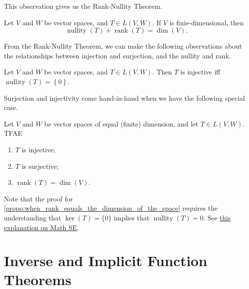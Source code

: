 \documentclass[notoc,notitlepage]{tufte-book}
\DeclareMathOperator{\nullity}{nullity}
\DeclareMathOperator{\rank}{rank}
\begin{document}
This observation gives us the Rank-Nullity Theorem.

\begin{thm}\label{thm:rank_nullity_theorem}
  Let $V$ and $W$ be vector spaces, and $T \in L(V, W)$. If $V$ is finie-dimensional, then
  \begin{equation*}
    \nullity(T) + \rank(T) = \dim (V).
  \end{equation*}
\end{thm}

From the Rank-Nullity Theorem,
we can make the following observations about the relationships
between injection and surjection, and the nullity and rank.

\begin{propo}\label{propo:nullity_of_only_0_and_injectivity}
  Let $V$ and $W$ be vector spaces, and $T \in L(V, W)$.
  Then $T$ is injective iff $\nullity(T) = \left\{ 0 \right\}$.
\end{propo}

Surjection and injectivity come hand-in-hand when
we have the following special case.

\begin{propo}\label{propo:when_rank_equals_the_dimension_of_the_space}
  Let $V$ and $W$ be vector spaces of equal (finite) dimension,
  and let $T \in L(V, W)$. TFAE
  \begin{enumerate}
    \item $T$ is injective;
    \item $T$ is surjective;
    \item $\rank(T) = \dim(V)$.
  \end{enumerate}
\end{propo}

Note that the proof for \cref{propo:when_rank_equals_the_dimension_of_the_space}
requires the understanding that $\ker(T) = \{ 0 \}$ implies that $\nullity(T) = 0$.
See \href{https://math.stackexchange.com/questions/664594/why-mathbf0-has-dimension-zero}{this explanation on Math SE}.


\section{Inverse and Implicit Function Theorems}%
\label{sec:inverse_and_implicit_function_theorems}
\end{document}
